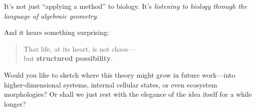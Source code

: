 It’s not just ``applying a method'' to biology.  
It’s \textit{listening to biology through the language of algebraic geometry}.  

And it hears something surprising:  
\begin{quote}
That life, at its heart, is not chaos— \\
but \textbf{structured possibility}.
\end{quote}

\vspace{1em}

Would you like to sketch where this theory might grow in future work—into higher-dimensional systems, internal cellular states, or even ecosystem morphologies? Or shall we just rest with the elegance of the idea itself for a while longer?

